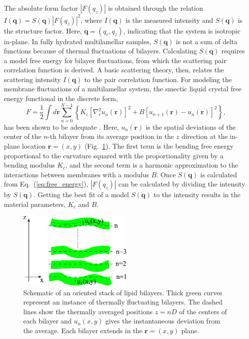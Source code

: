 The absolute form factor $|F(q_z)|$ is obtained through the relation
$I(\mathbf{q})= S(\mathbf{q})|F(q_z)|^2$, where $I(\mathbf{q})$ is the 
measured intensity and $S(\mathbf{q})$ is the structure factor.
Here, $\mathbf{q} = (q_r, q_z)$, indicating that the system is isotropic in-plane. 
In fully hydrated multilamellar samples, $S(\mathbf{q})$ is not a sum of delta 
functions because of thermal fluctuations of bilayers. Calculating $S(\mathbf{q})$
requires a model free energy for bilayer fluctuations, from which the scattering
pair correlation function is derived. A basic scattering theory, then, relates
the scattering intensity $I(\mathbf{q})$ to the pair correlation function. 
For modeling the membrane fluctuations of a multilamellar system, 
the smectic liquid crystal free energy functional in the discrete form,
\begin{equation}
  F=\frac{1}{2}\int d\mathbf{r}\sum _{n=0}^{N-1}\left\{ 
  K_{c} \left[\nabla _{r}^{2}u_{n}\left(\mathbf{r}\right)\right]^{2}
  +B\left[u_{n+1}\left(\mathbf{r}\right)-u_{n}\left(\mathbf{r}\right)\right]^{2}
  \right\},
  \label{eq:free_energy}
\end{equation}
has been shown to be adequate \cite{Lyatskaya01}.
Here, $u_{n}\left(\mathbf{r}\right)$ is the spatial deviations of the center 
of the $n$-th bilayer from its average position in the $z$ direction
at the in-plane location $\mathbf{r}=(x,y)$ (Fig.~\ref{fig:stack}).
The first term is the bending free energy proportional to the curvature
squared with the proportionality given by a bending modulus $K_{c}$, and
the second term is a harmonic approximation to the interactions between
membranes with a modulus $B$. 
Once $S(\mathbf{q})$ is calculated 
from Eq.~(\ref{eq:free_energy}), $|F(q_z)|$ can 
be calculated by dividing the intensity by $S(\mathbf{q})$. 
Getting the best fit of a model $S(\mathbf{q})$ to the intensity results in 
the material parameters, $K_c$ and $B$.

\begin{figure}[htbp]
  \centering
  \includegraphics[width=0.5\textwidth]{figures/Tat/MMs/stack}
  \caption{Schematic of an oriented stack of lipid bilayers. Thick green curves
  represent an instance of thermally fluctuating bilayers. The dashed lines 
  show the thermally averaged positions $z=nD$ of the centers of each bilayer 
  and $u_{n}(x,y)$ gives the instantaneous deviation from the average. 
  Each bilayer extends in the $\mathbf{r}=\left(x,y\right)$ plane.}
  \label{fig:stack}
\end{figure}

